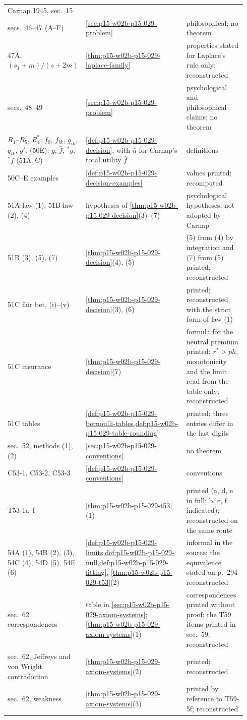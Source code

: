 \begin{center}
\begin{tabular}{@{}p{0.27\linewidth}p{0.42\linewidth}p{0.25\linewidth}@{}}
Carnap 1945, sec.~15\\
secs.~46--47 (A--F) & \cref{sec:p15-w02b-p15-029-problem} &
philosophical; no theorem\\
47A, \((s_1+m)/(s+2m)\) & \cref{thm:p15-w02b-p15-029-laplace-family}
& properties stated for Laplace's rule only; reconstructed\\
secs.~48--49 & \cref{sec:p15-w02b-p15-029-problem} & psychological and
philosophical claims; no theorem\\
\(R_1\)--\(R_5\), \(R_4^*\); \(f_0\), \(f_{ik}\), \(g_{ik}\),
\(q_{ik}\), \(g'_i\) (50E); \(\bar g\), \(\bar f\), \({}^*g\),
\({}^*f\) (51A--C) & \cref{def:p15-w02b-p15-029-decision}, with
\(\bar u\) for Carnap's total utility \(\bar f\) & definitions\\
50C--E examples & \cref{def:p15-w02b-p15-029-decision-examples} &
values printed; recomputed\\
51A law (1); 51B law (2), (4) & hypotheses of
\cref{thm:p15-w02b-p15-029-decision}(3)--(7) & psychological
hypotheses, not adopted by Carnap\\
51B (3), (5), (7) & \cref{thm:p15-w02b-p15-029-decision}(4), (5) &
(5) from (4) by integration and (7) from (5) printed; reconstructed\\
51C fair bet, (i)--(v) & \cref{thm:p15-w02b-p15-029-decision}(3), (6)
& printed; reconstructed, with the strict form of law (1)\\
51C insurance & \cref{thm:p15-w02b-p15-029-decision}(7) & formula for
the neutral premium printed; \(r^*>ph\), monotonicity and the limit
read from the table only; reconstructed\\
51C tables & \cref{def:p15-w02b-p15-029-bernoulli-tables,def:p15-w02b-p15-029-table-rounding}
& printed; three entries differ in the last digits\\
sec.~52, methods (1), (2) & \cref{sec:p15-w02b-p15-029-conventions} &
no theorem\\
C53-1, C53-2, C53-3 & \cref{def:p15-w02b-p15-029-conventions} &
conventions\\
T53-1a--f & \cref{thm:p15-w02b-p15-029-t53}(1) & printed (a, d, e in
full; b, c, f indicated); reconstructed on the same route\\
54A (1), 54B (2), (3), 54C (4), 54D (5), 54E (6) &
\cref{def:p15-w02b-p15-029-limits,def:p15-w02b-p15-029-null,def:p15-w02b-p15-029-fitting},
\cref{thm:p15-w02b-p15-029-t53}(2) & informal in the source; the
equivalence stated on p.~294 reconstructed\\
sec.~62 correspondences & table in
\cref{sec:p15-w02b-p15-029-axiom-systems};
\cref{thm:p15-w02b-p15-029-axiom-systems}(1) & correspondences printed
without proof; the T59 items printed in sec.~59; reconstructed\\
sec.~62, Jeffreys and von Wright contradiction & \cref{thm:p15-w02b-p15-029-axiom-systems}(2)
& printed; reconstructed\\
sec.~62, weakness & \cref{thm:p15-w02b-p15-029-axiom-systems}(3) &
printed by reference to T59-5f; reconstructed\\
\hline
\end{tabular}
\end{center}

